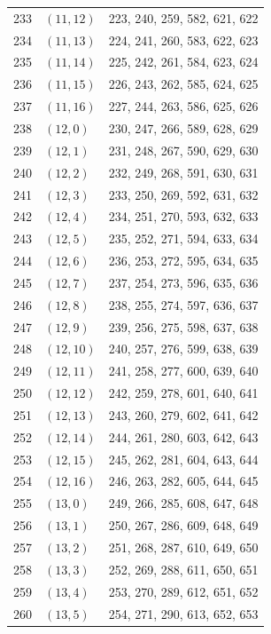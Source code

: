 \documentclass{article}
\begin{document}
\begin{longtable}{lll}
  233 & \((11, 12)\) & 223, 240, 259, 582, 621, 622 \\
  234 & \((11, 13)\) & 224, 241, 260, 583, 622, 623 \\
  235 & \((11, 14)\) & 225, 242, 261, 584, 623, 624 \\
  236 & \((11, 15)\) & 226, 243, 262, 585, 624, 625 \\
  237 & \((11, 16)\) & 227, 244, 263, 586, 625, 626 \\
  238 & \((12, 0)\) & 230, 247, 266, 589, 628, 629 \\
  239 & \((12, 1)\) & 231, 248, 267, 590, 629, 630 \\
  240 & \((12, 2)\) & 232, 249, 268, 591, 630, 631 \\
  241 & \((12, 3)\) & 233, 250, 269, 592, 631, 632 \\
  242 & \((12, 4)\) & 234, 251, 270, 593, 632, 633 \\
  243 & \((12, 5)\) & 235, 252, 271, 594, 633, 634 \\
  244 & \((12, 6)\) & 236, 253, 272, 595, 634, 635 \\
  245 & \((12, 7)\) & 237, 254, 273, 596, 635, 636 \\
  246 & \((12, 8)\) & 238, 255, 274, 597, 636, 637 \\
  247 & \((12, 9)\) & 239, 256, 275, 598, 637, 638 \\
  248 & \((12, 10)\) & 240, 257, 276, 599, 638, 639 \\
  249 & \((12, 11)\) & 241, 258, 277, 600, 639, 640 \\
  250 & \((12, 12)\) & 242, 259, 278, 601, 640, 641 \\
  251 & \((12, 13)\) & 243, 260, 279, 602, 641, 642 \\
  252 & \((12, 14)\) & 244, 261, 280, 603, 642, 643 \\
  253 & \((12, 15)\) & 245, 262, 281, 604, 643, 644 \\
  254 & \((12, 16)\) & 246, 263, 282, 605, 644, 645 \\
  255 & \((13, 0)\) & 249, 266, 285, 608, 647, 648 \\
  256 & \((13, 1)\) & 250, 267, 286, 609, 648, 649 \\
  257 & \((13, 2)\) & 251, 268, 287, 610, 649, 650 \\
  258 & \((13, 3)\) & 252, 269, 288, 611, 650, 651 \\
  259 & \((13, 4)\) & 253, 270, 289, 612, 651, 652 \\
  260 & \((13, 5)\) & 254, 271, 290, 613, 652, 653 \\

\end{longtable}
\end{document}
